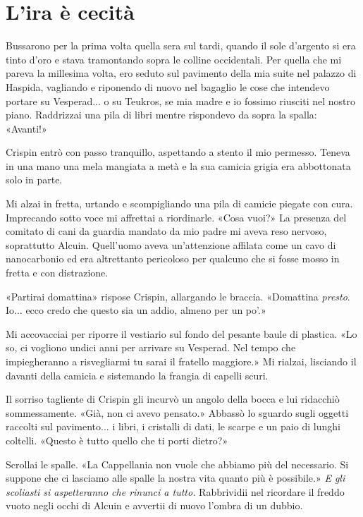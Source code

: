 \chapter{L'ira è cecità}

Bussarono per la prima volta quella sera sul tardi, quando il sole
d'argento si era tinto d'oro e stava tramontando sopra le colline
occidentali. Per quella che mi pareva la millesima volta, ero seduto sul
pavimento della mia suite nel palazzo di Haspida, vagliando e riponendo
di nuovo nel bagaglio le cose che intendevo portare su Vesperad... o su
Teukros, se mia madre e io fossimo riusciti nel nostro piano. Raddrizzai
una pila di libri mentre rispondevo da sopra la spalla: «Avanti!»

Crispin entrò con passo tranquillo, aspettando a stento il mio permesso.
Teneva in una mano una mela mangiata a metà e la sua camicia grigia era
abbottonata solo in parte.

Mi alzai in fretta, urtando e scompigliando una pila di camicie piegate
con cura. Imprecando sotto voce mi affrettai a riordinarle. «Cosa vuoi?»
La presenza del comitato di cani da guardia mandato da mio padre mi
aveva reso nervoso, soprattutto Alcuin. Quell'uomo aveva un'attenzione
affilata come un cavo di nanocarbonio ed era altrettanto pericoloso per
qualcuno che si fosse mosso in fretta e con distrazione.

«Partirai domattina» rispose Crispin, allargando le braccia. «Domattina
\emph{presto}. Io... ecco credo che questo sia un addio, almeno per un
po'.»

Mi accovacciai per riporre il vestiario sul fondo del pesante baule di
plastica. «Lo so, ci vogliono undici anni per arrivare su Vesperad. Nel
tempo che impiegheranno a risvegliarmi tu sarai il fratello maggiore.»
Mi rialzai, lisciando il davanti della camicia e sistemando la frangia
di capelli scuri.

Il sorriso tagliente di Crispin gli incurvò un angolo della bocca e lui
ridacchiò sommessamente. «Già, non ci avevo pensato.» Abbassò lo sguardo
sugli oggetti raccolti sul pavimento... i libri, i cristalli di dati, le
scarpe e un paio di lunghi coltelli. «Questo è tutto quello che ti porti
dietro?»

Scrollai le spalle. «La Cappellania non vuole che abbiamo più del
necessario. Si suppone che ci lasciamo alle spalle la nostra vita quanto
più è possibile.» \emph{E gli scoliasti si aspetteranno che rinunci a
	tutto.} Rabbrividii nel ricordare il freddo vuoto negli occhi di Alcuin
e avvertii di nuovo l'ombra di un dubbio.

